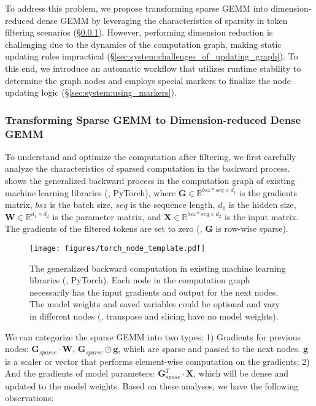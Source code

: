 To address this problem, we propose transforming sparse GEMM into dimension-reduced dense GEMM by leveraging the characteristics of sparsity in token filtering scenarios (\S\ref{sec:system:transfer_sparse_to_dense}). However, performing dimension reduction is challenging due to the dynamics of the computation graph, making static updating rules impractical (\S\ref{sec:system:challenges_of_updating_graph}). To this end, we introduce an automatic workflow that utilizes runtime stability to determine the graph nodes and employs special markers to finalize the node updating logic (\S\ref{sec:system:using_markers}).

\subsubsection{Transforming Sparse GEMM to Dimension-reduced Dense GEMM} \label{sec:system:transfer_sparse_to_dense}

To understand and optimize the computation after filtering, we first carefully analyze the characteristics of sparsed computation in the backward process.  shows the generalized backward process in the computation graph of existing machine learning libraries (\eg, PyTorch), where $\mathbf{G} \in \mathbb{R}^{bsz*seq \times d_1}$ is the gradients matrix, $bsz$ is the batch size, $seq$ is the sequence length, $d_1$ is the hidden size, $\mathbf{W} \in \mathbb{R}^{d_1 \times d_2}$ is the parameter matrix, and $\mathbf{X} \in \mathbb{R}^{bsz*seq \times d_2}$ is the input matrix. The gradients of the filtered tokens are set to zero (\ie, $\mathbf{G}$ is row-wise sparse).

\begin{figure}[h!]
	\centering
	\texttt{[image: figures/torch\_node\_template.pdf]}
	\caption{The generalized backward computation in existing machine learning libraries (\eg, PyTorch). Each node in the computation graph necessarily has the input gradients and output for the next nodes. The model weights and saved variables could be optional and vary in different nodes (\eg, transpose and slicing have no model weights).} 
	\label{fig:torch_node_template}
    \vspace{+2mm}
\end{figure}

We can categorize the sparse GEMM into two types: 1) Gradients for previous nodes: $\mathbf{G}_{sparse} \cdot \mathbf{W}$, $\mathbf{G}_{sparse} \odot \mathbf{g}$, which are sparse and passed to the next nodes. $\mathbf{g}$ is a scaler or vector that performs element-wise computation on the gradients; 2) And the gradients of model parameters: $\mathbf{G}^T_{spase} \cdot \mathbf{X}$, which will be dense and updated to the model weights. Based on these analyses, we have the following observations:


